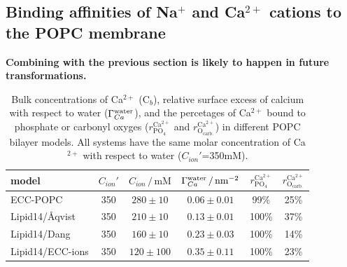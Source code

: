  


\subsection{Binding affinities of Na$^+$ and Ca$^{2+}$ cations to the POPC membrane} 
\label{sec:affinity} 
\textbf{ Combining with the previous section is likely to happen in future transformations. }
 
\begin{table}[tb!] 
  \caption{Bulk concentrations of Ca$^{2+}$ (C$_b$), relative surface excess of calcium with respect to water ($\Gamma_{Ca}^{\rm water}$), 
    and the percetages of Ca$^{2+}$ bound to phosphate or carbonyl oxyges ($r^\mathrm{Ca^{2+}} _\mathrm{PO_4} $ and $r^\mathrm{Ca^{2+}} _\mathrm{O_{carb.}}$) 
    in different POPC bilayer models. All systems have the same molar concentration of Ca$^{2+}$ with respect to water ($C_{ion}'$=350mM). 
  \label{tab:binding}} 
  \begin{tabular}{l|c c | c | c c} 
    model                  & $C_{ion}'$ & $C_{ion}\,/\,\mathrm{mM}$ & $\Gamma_{Ca}^{\rm water} \,/\, \mathrm{nm}^{-2}$  & $r^\mathrm{Ca^{2+}} _\mathrm{PO_4} $ & $r^\mathrm{Ca^{2+}} _\mathrm{O_{carb.}} $ \\ 
    \hline 
    ECC-POPC             &  350  &  $280\pm 10 $  &  $0.06 \pm 0.01 $                           &  99\%  &    25\%    \\ 
    Lipid14/Åqvist     &  350  &  $210\pm 10 $  &  $0.13 \pm 0.01 $                          & 100\%  &    37\%     \\ 
    Lipid14/Dang           &  350  &  $160\pm 10 $  &  $0.23 \pm 0.03 $                            & 100\%  &    14\%    \\ 
    Lipid14/ECC-ions       &  350  &  $120\pm 100$  &  $0.35 \pm 0.11 $                         & 100\%  &    23\%    \\ 
  \end{tabular} 
\end{table} 
 

